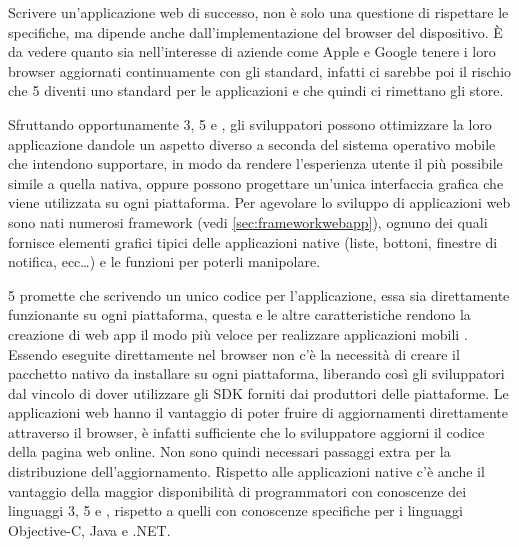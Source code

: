         Scrivere un'applicazione web di successo, non è solo una questione di
        rispettare le specifiche, ma dipende anche dall'implementazione del
        \mbox{browser} del dispositivo. È da vedere quanto sia nell'interesse di
        aziende come Apple e Google tenere i loro \mbox{browser} aggiornati
        continuamente con gli standard, infatti ci sarebbe poi il rischio che
        \html{}5 diventi uno standard per le applicazioni e che quindi ci rimettano
        gli \mbox{store}\citep{White:Native-vs-Html}.

        Sfruttando opportunamente \css{}3, \html{}5 e \js{}, gli sviluppatori
        possono ottimizzare la loro applicazione dandole un aspetto
        diverso a seconda del sistema operativo mobile che intendono supportare,
        in modo da rendere l'esperienza utente il più possibile simile a quella
        nativa, oppure possono progettare un'unica interfaccia grafica che viene
        utilizzata su ogni piattaforma. Per agevolare lo sviluppo di
        applicazioni web sono nati numerosi frame\-work
        (vedi \ref{sec:frameworkwebapp}), ognuno dei quali
        fornisce elementi grafici tipici delle applicazioni native
        (liste, bottoni, finestre di notifica, ecc\ldots) e le
        funzioni \js{} per poterli manipolare.

        \html{}5 promette che scrivendo un unico codice per l'applicazione,
        essa sia direttamente funzionante su ogni piattaforma, questa e le
        altre caratteristiche rendono la creazione di web app il modo più veloce
        per realizzare applicazioni mobili  \crossplat{}. Essendo eseguite
        direttamente nel \mbox{browser} non c'è la necessità di creare il pacchetto
        nativo da installare su ogni piattaforma, liberando così gli
        sviluppatori dal vincolo di dover utilizzare gli SDK forniti dai
        produttori delle piattaforme.
        Le applicazioni web hanno il vantaggio di poter fruire di aggiornamenti
        direttamente attraverso il \mbox{browser}, è infatti sufficiente che lo
        sviluppatore aggiorni il codice della pagina web online. Non sono quindi
        necessari passaggi extra per la distribuzione dell'aggiornamento.
        Rispetto alle applicazioni native c'è anche il vantaggio della maggior
        disponibilità di programmatori con conoscenze dei linguaggi \css{}3, \html{}5
        e \js{}, rispetto a quelli con conoscenze specifiche per i
        linguaggi Objective-C, Java e .NET.


